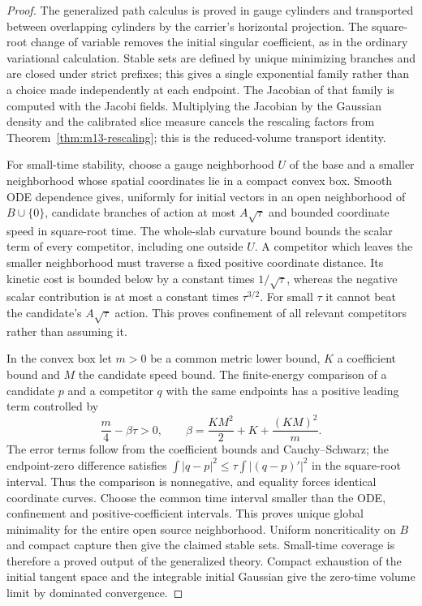 \begin{proof}
The generalized path calculus is proved in gauge cylinders and transported
between overlapping cylinders by the carrier's horizontal projection.  The
square-root change of variable removes the initial singular coefficient, as
in the ordinary variational calculation.  Stable sets are defined by unique minimizing branches and are closed
under strict prefixes; this gives a single exponential family rather than a
choice made independently at each endpoint.  The Jacobian of that family is
computed with the Jacobi fields.  Multiplying the Jacobian by the Gaussian
density and the calibrated slice measure cancels the rescaling factors from
Theorem~\ref{thm:m13-rescaling}; this is the reduced-volume transport identity.

For small-time stability, choose a gauge neighborhood $U$ of the base and
a smaller neighborhood whose spatial coordinates lie in a compact convex
box.  Smooth ODE dependence gives, uniformly for initial vectors in an open
neighborhood of $B\cup\{0\}$, candidate branches of action at most
$A\sqrt\tau$ and bounded coordinate speed in square-root time.  The
whole-slab curvature bound bounds the scalar term of every competitor,
including one outside $U$.  A competitor which leaves the smaller
neighborhood must traverse a fixed positive coordinate distance.  Its
kinetic cost is bounded below by a constant times $1/\sqrt\tau$, whereas
the negative scalar contribution is at most a constant times $\tau^{3/2}$.
For small $\tau$ it cannot beat the candidate's $A\sqrt\tau$ action.
This proves confinement of all relevant competitors rather than assuming it.

In the convex box let $m>0$ be a common metric lower bound, $K$ a coefficient
bound and $M$ the candidate speed bound.  The finite-energy comparison of a
candidate $p$ and a competitor $q$ with the same endpoints has a positive
leading term controlled by
\[
 \frac m4-\beta\tau>0,\qquad
 \beta=\frac{KM^2}{2}+K+\frac{(KM)^2}{m}.
\]
The error terms follow from the coefficient bounds and Cauchy--Schwarz;
the endpoint-zero difference satisfies
$\int|q-p|^2\leq\tau\int|(q-p)'|^2$ in the square-root interval.
Thus the comparison is nonnegative, and equality forces identical coordinate
curves.  Choose the common time interval smaller than the ODE, confinement
and positive-coefficient intervals.  This proves unique global minimality
for the entire open source neighborhood.  Uniform noncriticality on $B$
and compact capture then give the claimed stable sets.  Small-time coverage
is therefore a proved output of the generalized theory.
Compact exhaustion of the initial tangent space and the integrable initial
Gaussian give the zero-time volume limit by dominated convergence.


\end{proof}

